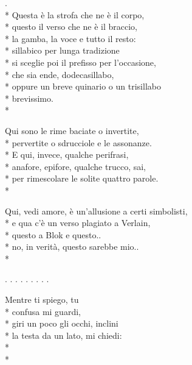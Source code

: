 \documentclass[12pt]{book}
\begin{document}
\begin{poem}{}{}

\settowidth{\versewidth}{non meno è ciò che meriti.}

\begin{altverse}
.\\*
Questa è la strofa che ne è il corpo, \\*
questo il verso che ne è il braccio, \\*
la gamba, la voce e tutto il resto: \\*
sillabico per lunga tradizione \\*
si sceglie poi il prefisso per l'occasione, \\*
che sia ende, dodecasillabo, \\*
oppure un breve quinario o un trisillabo \\*
brevissimo. \\* 
\end{altverse}

\begin{altverse}
Qui sono le rime baciate o invertite, \\*
pervertite o sdrucciole e le assonanze. \\*
E qui, invece, qualche perifrasi, \\*
anafore, epifore, qualche trucco, sai, \\*
per rimescolare le solite quattro parole. \\*
\end{altverse}

\begin{altverse}
Qui, vedi amore, è un'allusione a certi simbolisti, \\*
e qua c'è un verso plagiato a Verlain, \\*
questo a Blok e questo.. \\*
no, in verità, questo sarebbe mio.. \\* 
\end{altverse}

. . . . . . . . .

\begin{altverse}
Mentre ti spiego, tu \\*
confusa mi guardi, \\*
giri un poco gli occhi, inclini \\*
la testa da un lato, mi chiedi: \\*
 \\*
\end{altverse}


\end{poem}
\end{document}
